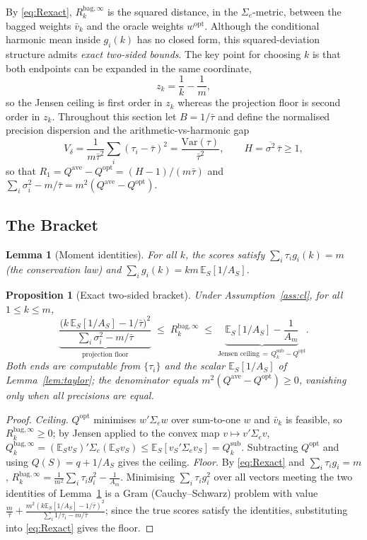 \documentclass[12pt,a4paper]{article}
\newtheorem{proposition}{Proposition}
\newtheorem{lemma}{Lemma}
\theoremstyle{definition}
\newcommand{\Sig}{\Sigma_e}
\newcommand{\wopt}{w^{\mathrm{opt}}}
\newcommand{\Qopt}{Q^{\mathrm{opt}}}
\newcommand{\Qave}{Q^{\mathrm{ave}}}
\newcommand{\Qsub}{Q_k^{\mathrm{sub}}}
\newcommand{\Qbag}{Q_k^{\mathrm{bag},\infty}}
\newcommand{\Rk}{R_k^{\mathrm{bag},\infty}}
\newcommand{\vbar}{\bar{v}_k}
\newcommand{\E}{\mathbb{E}}
\newcommand{\Var}{\mathrm{Var}}
\begin{document}
By \eqref{eq:Rexact}, $\Rk$ is the squared distance, in the $\Sig$-metric,
between the bagged weights $\vbar$ and the oracle weights $\wopt$.  Although
the conditional harmonic mean inside $g_i(k)$ has no closed form, this
squared-deviation structure admits \emph{exact two-sided bounds}.  The key
point for choosing $k$ is that both endpoints can be expanded in the same
coordinate,
\[
  z_k=\frac{1}{k}-\frac{1}{m},
\]
so the Jensen ceiling is first order in $z_k$ whereas the projection floor
is second order in $z_k$.  Throughout this section let
$B=1/\bar\tau$ and define the normalised precision dispersion and the
arithmetic-vs-harmonic gap
\begin{equation}\label{eq:VdH}
  V_\delta=\frac{1}{m\bar\tau^2}\sum_i(\tau_i-\bar\tau)^2=\frac{\Var(\tau)}{\bar\tau^2},
  \qquad H=\overline{\sigma^2}\,\bar\tau\ge1,
\end{equation}
so that $R_1=\Qave-\Qopt=(H-1)/(m\bar\tau)$ and
$\sum_i\sigma_i^2-m/\bar\tau=m^2(\Qave-\Qopt)$.

\subsection{The Bracket}

\begin{lemma}[Moment identities]\label{lem:moments2}
For all $k$, the scores satisfy $\sum_i\tau_i g_i(k)=m$ (the conservation law)
and $\sum_i g_i(k)=km\,\E_S[1/A_S]$.
\end{lemma}

\begin{proposition}[Exact two-sided bracket]\label{prop:bracket}
Under Assumption~\ref{ass:cl}, for all $1\le k\le m$,
\begin{equation}\label{eq:bracket}
  \underbrace{\frac{\bigl(k\,\E_S[1/A_S]-1/\bar\tau\bigr)^2}
       {\sum_i\sigma_i^2-m/\bar\tau}}_{\text{projection floor}}
  \;\le\;\Rk\;\le\;
  \underbrace{\E_S[1/A_S]-\frac{1}{A_m}}_{\text{Jensen ceiling}\,=\,\Qsub-\Qopt}.
\end{equation}
Both ends are computable from $\{\tau_i\}$ and the scalar $\E_S[1/A_S]$ of
Lemma~\ref{lem:taylor}; the denominator equals $m^2(\Qave-\Qopt)\ge0$,
vanishing only when all precisions are equal.
\end{proposition}

\begin{proof}
\emph{Ceiling.} $\Qopt$ minimises $w'\Sig w$ over sum-to-one $w$ and $\vbar$ is
feasible, so $\Rk\ge0$; by Jensen applied to the convex map
$v\mapsto v'\Sig v$,
$\Qbag=(\E_S v_S)'\Sig(\E_S v_S)\le\E_S[v_S'\Sig v_S]=\Qsub$.  Subtracting
$\Qopt$ and using $Q(S)=q+1/A_S$ gives the ceiling.  \emph{Floor.} By
\eqref{eq:Rexact} and $\sum_i\tau_i g_i=m$,
$\Rk=\tfrac1{m^2}\sum_i\tau_i g_i^2-\tfrac1{A_m}$.  Minimising
$\sum_i\tau_i g_i^2$ over all vectors meeting the two identities of
Lemma~\ref{lem:moments2} is a Gram (Cauchy--Schwarz) problem with value
$\tfrac{m}{\bar\tau}+\tfrac{m^2(k\E_S[1/A_S]-1/\bar\tau)^2}
{\sum_i1/\tau_i-m/\bar\tau}$; since the true scores satisfy the identities,
substituting into \eqref{eq:Rexact} gives the floor.
\end{proof}
\end{document}
